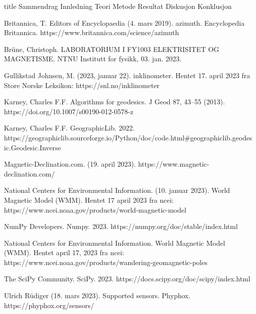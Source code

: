 \documentclass[5p]{article}
\begin{document}
{title} %
{Sammendrag}
\pagebreak
{Innledning}
{Teori}
\pagebreak
{Metode}
{Resultat}
{Diskusjon}
{Konklusjon}

\begin{thebibliography}{5}
 Britannica, T. Editors of Encyclopaedia (4. mars 2019). azimuth. Encyclopedia Britannica. https://www.britannica.com/science/azimuth

Brüne, Christoph. LABORATORIUM I FY1003 ELEKTRISITET OG MAGNETISME. NTNU Institutt for fysikk, 03. jan. 2023.

Gullikstad Johnsen, M. (2023, januar 22). inklinometer. Hentet 17. april 2023 fra Store Norske Leksikon: https://snl.no/inklinometer

 Karney, Charles F.F. Algorithms for geodesics. J Geod 87, 43–55 (2013). https://doi.org/10.1007/s00190-012-0578-z

 Karney, Charles F.F. GeographicLib. 2022. \\
https://geographiclib.sourceforge.io/Python/doc/code.html\#geographiclib.geodesic.Geodesic.Inverse

 Magnetic-Declination.com. (19. april 2023). https://www.magnetic-declination.com/

National Centers for Environmental Information. (10. januar 2023). World Magnetic Model (WMM). Hentet 17 april 2023 fra ncei: https://www.ncei.noaa.gov/products/world-magnetic-model

 NumPy Developers. Numpy. 2023. https://numpy.org/doc/stable/index.html

National Centers for Environmental Information. World Magnetic Model (WMM). Hentet april 17, 
2023 fra ncei: https://www.ncei.noaa.gov/products/wandering-geomagnetic-poles

 The SciPy Community. SciPy. 2023. 
https://docs.scipy.org/doc/scipy/index.html

 Ulrich Rüdiger (18. mars 2023). Supported sensors. Phyphox. 
https://phyphox.org/sensors/

\end{thebibliography}
\end{document}
